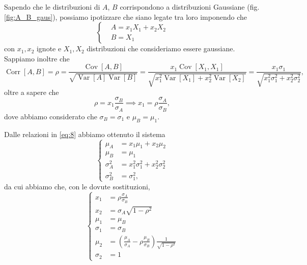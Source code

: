 \documentclass[a4paper,aps,12pt,tightenlines]{revtex4-2}
\DeclareMathOperator{\Corr}{Corr}
\DeclareMathOperator{\Cov}{Cov}
\DeclareMathOperator{\Var}{Var}
\begin{document}
Sapendo che le distribuzioni di $A$, $B$ corrispondono a distribuzioni Gaussiane (fig. \ref{fig:A_B_gaus}), possiamo ipotizzare che siano legate tra loro imponendo che \begin{equation} \left\{ 
    \begin{aligned}
        & A = x_1 X _1 + x_2 X_2\\
        & B = X_1
    \end{aligned}
\right.\label{eq:8}
\end{equation}
con $x_1, x_2$ ignote e $X_1, X_2$ distribuzioni che consideriamo essere gaussiane. Sappiamo inoltre che \begin{equation} \Corr[A,B] = \rho = \frac{\Cov[A,B]}{\sqrt{\Var[A]\Var[B]}} =  \frac{x_1\Cov[X_1, X_1]}{\sqrt{x_1^2\Var[X_1] + x_2^2\Var[X_2]}} = \frac{x_1\sigma_1}{\sqrt{x_1^2\sigma_1^2+x_2^2\sigma_2^2}},\end{equation} oltre a sapere che \begin{equation} \rho = x_1\frac{\sigma_B}{\sigma_A} \implies x_1 = \rho\frac{\sigma_A}{\sigma_B}, \end{equation} dove abbiamo considerato che $\sigma_B = \sigma_1$ e $\mu_B = \mu_1$. 

Dalle relazioni in \eqref{eq:8} abbiamo ottenuto il sistema \begin{equation}\left\{
    \begin{aligned}
        \mu_A &= x_1 \mu_1 + x_2 \mu_2\\
        \mu_B &= \mu_1\\
        \sigma_A^2 &= x_1^2\sigma_1^2 + x_2^2\sigma_2^2\\
        \sigma_B^2 &= \sigma_1^2,
    \end{aligned}
\right.
\end{equation}
da cui abbiamo che, con le dovute sostituzioni, \begin{equation}\left\{
    \begin{aligned} 
    x_1 &= \rho \frac{\sigma_A}{\sigma_B}\\
    x_2 &= \sigma_A \sqrt{1-\rho^2}\\
    \mu_1 &= \mu_B\\
    \sigma_1 &= \sigma_B\\
    \mu_2 & = \left(\frac{\mu_A}{\sigma_A} - \rho\frac{\mu_B}{\sigma_B}\right)\frac{1}{\sqrt{1-\rho^2}}\\
    \sigma_2 &= 1
    \end{aligned}
\right.
\end{equation}
\end{document}
